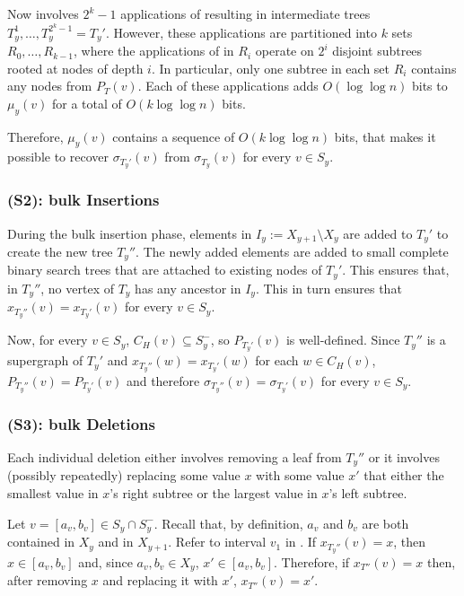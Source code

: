 \documentclass[kpfonts]{patmorin}
\begin{document}
Now  involves $2^k-1$ applications of  resulting in intermediate trees $T_y^1,\ldots,T_y^{2^k-1}=T_y'$.  However, these applications are partitioned into $k$ sets $R_0,\ldots,R_{k-1}$, where the applications of  in $R_i$ operate on $2^i$ disjoint subtrees rooted at nodes of depth $i$.  In particular, only one subtree in each set $R_i$ contains any nodes from $P_{T}(v)$.  Each of these applications adds $O(\log\log n)$ bits to $\mu_y(v)$ for a total of $O(k\log\log n)$ bits.

Therefore, $\mu_y(v)$ contains a sequence of $O(k\log\log n)$ bits, that makes it possible to recover $\sigma_{T_y'}(v)$ from $\sigma_{T_y}(v)$ for every $v\in S_y$.

\subsubsection{(S2): bulk Insertions}

During the bulk insertion phase, elements in $I_y:=X_{y+1}\setminus X_y$ are added to $T_y'$ to create the new tree $T_{y}''$.  The newly added elements are added to small complete binary search trees that are attached to existing nodes of $T_{y}'$.  This ensures that, in $T_y''$, no vertex of $T_y$ has any ancestor in $I_y$.  This in turn ensures that $x_{T_y''}(v)=x_{T_y'}(v)$ for every $v\in S_y$.  

Now, for every $v\in S_y$, $C_H(v)\subseteq S^-_y$, so $P_{T_y'}(v)$ is well-defined.  Since $T_y''$ is a supergraph of $T_y'$ and $x_{T_y''}(w)=x_{T_y'}(w)$ for each $w\in C_H(v)$, $P_{T_y''}(v)=P_{T_y'}(v)$ and therefore $\sigma_{T_y''}(v)=\sigma_{T_y'}(v)$ for every $v\in S_y$.

\subsubsection{(S3): bulk Deletions}

Each individual deletion either involves removing a leaf from $T_y''$ or it involves (possibly repeatedly) replacing some value $x$ with some value $x'$ that either the smallest value in $x$'s right subtree or the largest value in $x$'s left subtree.

Let $v=[a_v,b_v]\in S_y\cap S^-_y$.  Recall that, by definition, $a_v$ and $b_v$ are both contained in $X_y$ and in $X_{y+1}$.  Refer to interval $v_1$ in .  If $x_{T_y''}(v)=x$, then $x\in[a_v,b_v]$ and, since $a_v,b_v\in X_{y}$, $x'\in[a_v,b_v]$.  Therefore, if $x_{T''}(v)=x$ then, after removing $x$ and replacing it with $x'$, $x_{T''}(v)=x'$.  
\end{document}
